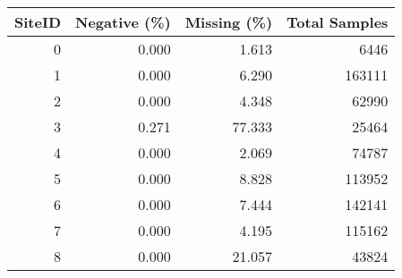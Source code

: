 \begin{tabular}{rrrr}
\toprule
 SiteID &  Negative (\%) &  Missing (\%) &  Total Samples \\
\midrule
      0 &         0.000 &        1.613 &           6446 \\
      1 &         0.000 &        6.290 &         163111 \\
      2 &         0.000 &        4.348 &          62990 \\
      3 &         0.271 &       77.333 &          25464 \\
      4 &         0.000 &        2.069 &          74787 \\
      5 &         0.000 &        8.828 &         113952 \\
      6 &         0.000 &        7.444 &         142141 \\
      7 &         0.000 &        4.195 &         115162 \\
      8 &         0.000 &       21.057 &          43824 \\
\bottomrule
\end{tabular}
